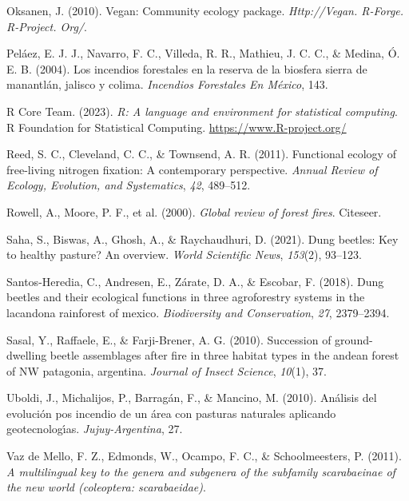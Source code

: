 \documentclass[
  11pt,
  a4paper]{book}
\newlength{\cslhangindent}
\newlength{\cslentryspacingunit} %
\newenvironment{CSLReferences}[2] %
 {%
  \setlength{\parindent}{0pt}
  \ifodd #1
  \let\oldpar\par
  \def\par{\hangindent=\cslhangindent\oldpar}
  \fi
  \setlength{\parskip}{#2\cslentryspacingunit}
 }%
 {}
\begin{document}
\begin{CSLReferences}{1}{0}
\leavevmode{}%
Oksanen, J. (2010). Vegan: Community ecology package. \emph{Http://Vegan. R-Forge. R-Project. Org/}.

\leavevmode{}%
Peláez, E. J. J., Navarro, F. C., Villeda, R. R., Mathieu, J. C. C., \& Medina, Ó. E. B. (2004). Los incendios forestales en la reserva de la biosfera sierra de manantl{á}n, jalisco y colima. \emph{Incendios Forestales En M{é}xico}, 143.

\leavevmode{}%
R Core Team. (2023). \emph{R: A language and environment for statistical computing}. R Foundation for Statistical Computing. \url{https://www.R-project.org/}

\leavevmode{}%
Reed, S. C., Cleveland, C. C., \& Townsend, A. R. (2011). Functional ecology of free-living nitrogen fixation: A contemporary perspective. \emph{Annual Review of Ecology, Evolution, and Systematics}, \emph{42}, 489--512.

\leavevmode{}%
Rowell, A., Moore, P. F., et al. (2000). \emph{Global review of forest fires}. Citeseer.

\leavevmode{}%
Saha, S., Biswas, A., Ghosh, A., \& Raychaudhuri, D. (2021). Dung beetles: Key to healthy pasture? An overview. \emph{World Scientific News}, \emph{153}(2), 93--123.

\leavevmode{}%
Santos-Heredia, C., Andresen, E., Zárate, D. A., \& Escobar, F. (2018). Dung beetles and their ecological functions in three agroforestry systems in the lacandona rainforest of mexico. \emph{Biodiversity and Conservation}, \emph{27}, 2379--2394.

\leavevmode{}%
Sasal, Y., Raffaele, E., \& Farji-Brener, A. G. (2010). Succession of ground-dwelling beetle assemblages after fire in three habitat types in the andean forest of NW patagonia, argentina. \emph{Journal of Insect Science}, \emph{10}(1), 37.

\leavevmode{}%
Uboldi, J., Michalijos, P., Barragán, F., \& Mancino, M. (2010). An{á}lisis del evoluci{ó}n pos incendio de un {á}rea con pasturas naturales aplicando geotecnolog{ı́}as. \emph{Jujuy-Argentina}, 27.

\leavevmode{}%
Vaz de Mello, F. Z., Edmonds, W., Ocampo, F. C., \& Schoolmeesters, P. (2011). \emph{A multilingual key to the genera and subgenera of the subfamily scarabaeinae of the new world (coleoptera: scarabaeidae)}.


\end{CSLReferences}
\end{document}
